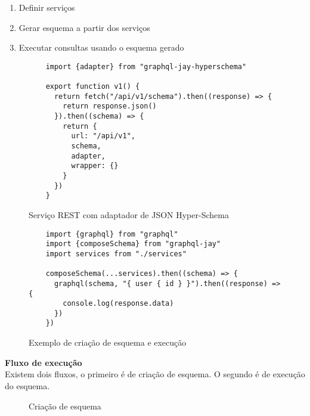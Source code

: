 \begin{enumerate}
\item Definir serviços
\item Gerar esquema a partir dos serviços
\item Executar consultas usando o esquema gerado
\end{enumerate}

\begin{figure}[H]
  \centering
  \begin{verbatim}
    import {adapter} from "graphql-jay-hyperschema"
  
    export function v1() {
      return fetch("/api/v1/schema").then((response) => {
        return response.json()
      }).then((schema) => {
        return {
          url: "/api/v1",
          schema,
          adapter,
          wrapper: {}
        }
      })
    }
  \end{verbatim}
  \caption{Serviço REST com adaptador de JSON Hyper-Schema}
\end{figure}

\begin{figure}[H]
  \centering
  \begin{verbatim}
    import {graphql} from "graphql"
    import {composeSchema} from "graphql-jay"
    import services from "./services"
    
    composeSchema(...services).then((schema) => {
      graphql(schema, "{ user { id } }").then((response) => { 
        console.log(response.data)
      })
    })
  \end{verbatim}
  \caption{Exemplo de criação de esquema e execução}
\end{figure}

\textbf{Fluxo de execução} \\

Existem dois fluxos, o primeiro é de criação de esquema. O segundo é de execução do esquema.

\begin{figure}[H]
  \centering
  \caption{Criação de esquema}
\end{figure}

